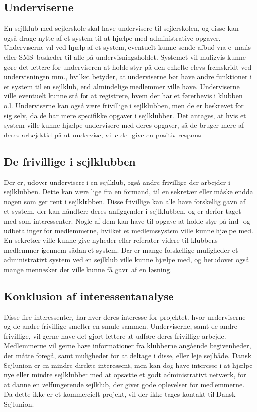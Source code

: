 \subsection{Underviserne}

En sejlklub med sejlerskole skal have undervisere til sejlerskolen, og disse kan også drage nytte af et system til at hjælpe med administrative opgaver. 
Underviserne vil ved hjælp af et system, eventuelt kunne sende afbud via e--mails eller SMS--beskeder til alle på undervisningsholdet. 
Systemet vil muligvis kunne gøre det lettere for underviseren at holde styr på den enkelte elevs fremskridt ved undervisningen mm., hvilket betyder, at underviserne bør have andre funktioner i et system til en sejlklub, end almindelige medlemmer ville have.
Underviserne ville eventuelt kunne stå for at registrere, hvem der har et førerbevis i klubben o.l.
Underviserne kan også være frivillige i sejlklubben, men de er beskrevet for sig selv, da de har mere specifikke opgaver i sejlklubben.
Det antages, at hvis et system ville kunne hjælpe undervisere med deres opgaver, så de bruger mere af deres arbejdstid på at undervise, ville det give en positiv respons.


\subsection{De frivillige i sejlklubben}

Der er, udover undervisere i en sejlklub, også andre frivillige der arbejder i sejlklubben.
Dette kan være lige fra en formand, til en sekretær eller måske endda nogen som gør rent i sejlklubben. 
Disse frivillige kan alle have forskellig gavn af et system, der kan håndtere deres anliggender i sejlklubben, og er derfor taget med som interessenter. 
Nogle af dem kan have til opgave at holde styr på ind- og udbetalinger for medlemmerne, hvilket et medlemssystem ville kunne hjælpe med. 
En sekretær ville kunne give nyheder eller referater videre til klubbens medlemmer igennem sådan et system. 
Der er mange forskellige muligheder et administrativt system ved en sejlklub ville kunne hjælpe med, og herudover også mange mennesker der ville kunne få gavn af en løsning.


\subsection{Konklusion af interessentanalyse}

Disse fire interessenter, har hver deres interesse for projektet, hvor underviserne og de andre frivillige smelter en smule sammen. 
Underviserne, samt de andre frivillige, vil gerne have det gjort lettere at udføre deres frivillige arbejde.
Medlemmerne vil gerne have informationer fra klubberne angående begivenheder, der måtte foregå, samt muligheder for at deltage i disse, eller leje sejlbåde.
Dansk Sejlunion er en mindre direkte interessent, men kan dog have interesse i at hjælpe nye eller mindre sejlklubber med at opsætte et godt administrativt netværk, for at danne en velfungerende sejlklub, der giver gode oplevelser for medlemmerne.
Da dette ikke er et kommercielt projekt, vil der ikke tages kontakt til Dansk Sejlunion.
